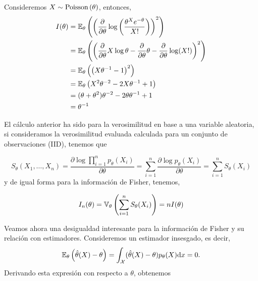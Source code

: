 \begin{exercise}
	Consideremos $X\sim\text{Poisson}\left(\theta\right)$, entonces, 
	\begin{align}
		I(\theta) &= \mathbb{E}_\theta \left(\left(\frac{\partial}{\partial\theta}\log\left(\frac{\theta^Xe^{-\theta}}{X!}\right)\right)^2\right)\nonumber	\\
		&= \mathbb{E}_\theta \left(\left( \frac{\partial}{\partial\theta}X\log\theta - \frac{\partial}{\partial\theta}\theta - \frac{\partial}{\partial\theta}\log(X!)\right)^2\right)\nonumber\\
		&= \mathbb{E}_\theta \left(\left( X\theta^{-1} - 1\right)^2\right)\nonumber	\\
		&= \mathbb{E}_\theta \left( X^2\theta^{-2} -2X\theta^{-1}+ 1\right)\nonumber	\\
		&= (\theta+\theta^2)\theta^{-2} -2\theta\theta^{-1}+ 1\nonumber\\
		&= \theta^{-1}\nonumber	
	\end{align}
\end{exercise}

El cálculo anterior ha sido para la verosimilitud en base a una variable aleatoria, si consideramos la verosimilitud evaluada calculada para un conjunto de observaciones (IID), tenemos que

\begin{equation}
	S_\theta(X_1,\ldots,X_n) = \frac{\partial \log \prod_{i=1}^np_\theta(X_i)}{\partial\theta} = \sum_{i=1}^n\frac{\partial \log p_\theta(X_i)}{\partial\theta}= \sum_{i=1}^n S_\theta(X_i)
\end{equation}
y de igual forma para la información de Fisher, tenemos, 

\begin{equation}
	I_n(\theta) = \mathbb{V}_\theta \left(\sum_{i=1}^n S_\theta(X_i)\right) = n I(\theta)
\end{equation}

Veamos ahora una desigualdad interesante para la información de Fisher y su relación con estimadores. Consideremos un estimador insesgado, es decir, 
\begin{equation}
	\mathbb{E}_\theta \left(\hat{\theta}(X)-\theta\right)=\int_{\mathcal X} (\hat{\theta}(X)-\theta)p_\theta(X){\text{d}x}=0.
\end{equation}
Derivando esta expresión con respecto a $\theta$, obtenemos


